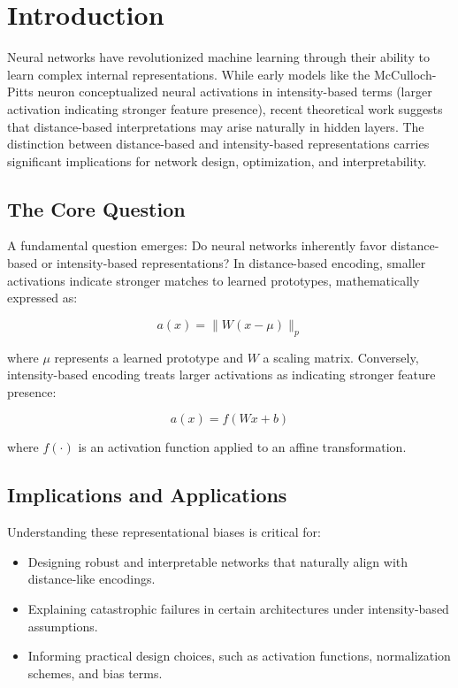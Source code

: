 \section{Introduction}

Neural networks have revolutionized machine learning through their ability to learn complex internal representations. While early models like the McCulloch-Pitts neuron conceptualized neural activations in intensity-based terms (larger activation indicating stronger feature presence), recent theoretical work suggests that distance-based interpretations may arise naturally in hidden layers. The distinction between distance-based and intensity-based representations carries significant implications for network design, optimization, and interpretability.

\subsection{The Core Question}

A fundamental question emerges: Do neural networks inherently favor distance-based or intensity-based representations? In distance-based encoding, smaller activations indicate stronger matches to learned prototypes, mathematically expressed as:

\begin{equation}
    a(x) = \|W(x - \mu)\|_p
\end{equation}

where $\mu$ represents a learned prototype and $W$ a scaling matrix. Conversely, intensity-based encoding treats larger activations as indicating stronger feature presence:

\begin{equation}
    a(x) = f(Wx + b)
\end{equation}

where $f(\cdot)$ is an activation function applied to an affine transformation.

\subsection{Implications and Applications}

Understanding these representational biases is critical for:

\begin{itemize}
    \item Designing robust and interpretable networks that naturally align with distance-like encodings.
    \item Explaining catastrophic failures in certain architectures under intensity-based assumptions.
    \item Informing practical design choices, such as activation functions, normalization schemes, and bias terms.
\end{itemize}

